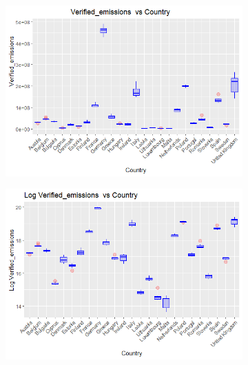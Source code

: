 \documentclass[a4paper,twoside,10pt]{article}
\begin{document}
\begin{figure}[H]
	\centering
	\begin{subfigure}[]{0.8\textwidth}
		\centering
	\includegraphics[width=1\linewidth]{images/Boxplot_Verified}
		\caption{}
		\label{fig:boxplot-Verified emissions-vs-country}
	\end{subfigure}
	\begin{subfigure}[]{0.8\textwidth}
		\centering
	\includegraphics[width=1\linewidth]{images/boxplot_verified_log}
		\caption{}
		\label{fig:boxplot-Verified emissions-vs-country}
	\end{subfigure}
\end{figure}
\end{document}
